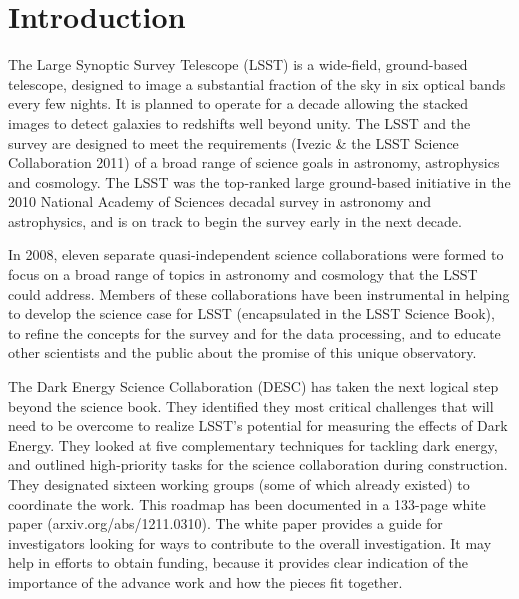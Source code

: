 
\chapter[Introduction]{Introduction}
\label{ch:intro}

The Large Synoptic Survey Telescope (LSST) is a wide-field, ground-based
telescope, designed to image a substantial fraction of the sky in six optical
bands every few nights. It is planned to operate for a decade allowing the
stacked images to detect galaxies to redshifts well beyond unity. The LSST and
the survey are designed to meet the requirements (Ivezic \& the LSST Science
Collaboration 2011) of a broad range of science goals in astronomy, astrophysics
and cosmology.  The LSST was the top-ranked large ground-based initiative in the
2010 National Academy of Sciences decadal survey in astronomy and astrophysics,
and is on track to begin the survey early in the next decade.

In 2008, eleven separate quasi-independent science collaborations were formed to
focus on a broad range of topics in astronomy and cosmology that the LSST could
address. Members of these collaborations have been instrumental in helping to
develop the science case for LSST (encapsulated in the LSST Science Book), to
refine the concepts for the survey and for the data processing, and to educate
other scientists and the public about the promise of this unique observatory.

The Dark Energy Science Collaboration (DESC) has taken the
next logical step beyond the science book. They identified they most critical
challenges that will need to be overcome to realize LSST’s potential for
measuring the effects of Dark Energy. They looked at five complementary
techniques for tackling dark energy, and outlined high-priority tasks for the
science collaboration during construction. They designated sixteen working
groups (some of which already existed) to coordinate the work. This roadmap has
been documented in a 133-page white paper (arxiv.org/abs/1211.0310). The white
paper provides a guide for investigators looking for ways to contribute to the
overall investigation. It may help in efforts to obtain funding, because it
provides clear indication of the importance of the advance work and how the
pieces fit together.


